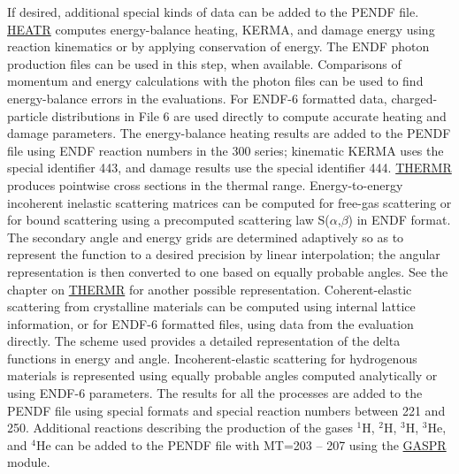 If desired, additional special kinds of data can be added to the
PENDF file.  \hyperlink{sHEATRhy}{HEATR}
computes energy-balance heating,
 KERMA, and damage energy
using reaction kinematics or by applying conservation of energy.  The
ENDF photon production files can be used in this step, when available.
Comparisons of momentum and energy calculations with the photon files
can be used to find energy-balance errors in the evaluations.
 For ENDF-6 formatted data,
charged-particle distributions in File 6 are used
directly to compute accurate heating and damage parameters.  The
energy-balance heating results are
added to the PENDF file using ENDF reaction numbers in the 300 series;
kinematic KERMA uses the special identifier
443, and damage results use the special identifier
444.  \hyperlink{sTHERMRhy}{THERMR}
 produces pointwise cross
sections in the thermal range.  Energy-to-energy incoherent inelastic
scattering matrices can be computed for
free-gas scattering or for bound scattering using
a precomputed scattering law S($\alpha$,$\beta$)
in ENDF format.  The secondary angle and energy grids are
determined adaptively so as to represent the function to a
desired precision by linear interpolation;  the angular
representation is then converted to one based on equally probable
angles.  See the chapter on \hyperlink{sTHERMRhy}{THERMR}
for another possible representation.
Coherent-elastic scattering from crystalline
materials can be computed using internal lattice information, or
for ENDF-6 formatted files, using data from the evaluation directly.
The scheme used provides a detailed representation of the delta
functions in energy and angle.  Incoherent-elastic scattering
 for hydrogenous materials is represented
using equally probable angles computed analytically or using
ENDF-6 parameters.  The results for all the processes are added to
the PENDF file using special formats and special reaction numbers
between 221 and 250.  Additional reactions describing
the production of the gases  $^1$H, $^2$H,
$^3$H, $^3$He, and $^4$He can be added to the PENDF file with
MT=203 -- 207 using the
\hyperlink{sGASPRhy}{GASPR} module.

